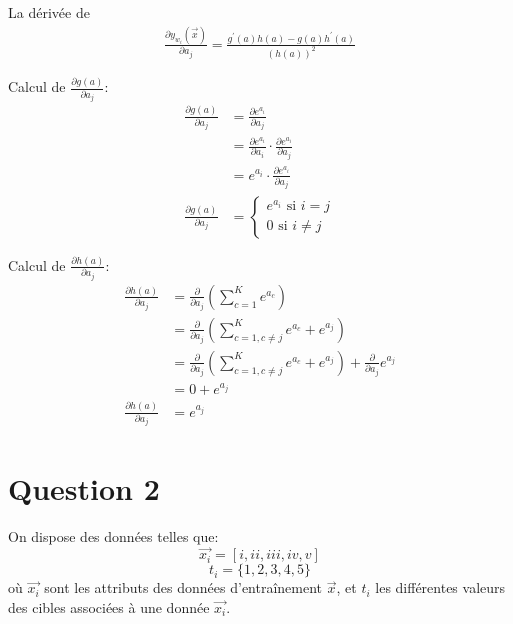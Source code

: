 La dérivée de 
\begin{equation}
\begin{split}
	\frac{\partial y_{w_i}(\overrightarrow{x})} {\partial a_j} = \frac{g^{'}(a) h(a) - g(a) h^{'}(a)} {(h(a))^2}
\end{split}
\end{equation}

Calcul de $ \frac{\partial g(a)} {\partial a_j} $:
\begin{equation}
\begin{split}
	 \frac{\partial g(a)} {\partial a_j} &= \frac{\partial e^{a_i}} {\partial a_j} \\
	 &= \frac{\partial e^{a_i}} {\partial a_i} \cdot \frac{\partial e^{a_i}} {\partial a_j} \\
	 &= e^{a_i} \cdot \frac{\partial e^{a_i}} {\partial a_j} \\
	 \frac{\partial g(a)} {\partial a_j} &= 
	 \begin{cases}
		 e^{a_i} \text{ si } i=j \\
		 0 \text{ si } i \neq j
	 \end{cases} 
\end{split}
\end{equation}

Calcul de $ \frac{\partial h(a)} {\partial a_j} $:
\begin{equation}
\begin{split}
	\frac{\partial h(a)} {\partial a_j} &= \frac{\partial}{\partial a_j} (\sum_{c=1}^K e^{a_c}) \\
	&= \frac{\partial}{\partial a_j}  \left( \sum_{c=1, c \neq j}^K e^{a_c} + e^{a_j} \right) \\
	&= \frac{\partial}{\partial a_j} \left( \sum_{c=1, c \neq j}^K e^{a_c} + e^{a_j} \right) +  \frac{\partial}{\partial a_j} e^{a_j} \\
	&= 0 + e^{a_j} \\
	\frac{\partial h(a)} {\partial a_j} &=  e^{a_j}
\end{split}
\end{equation}

\section{Question 2}
On dispose des données telles que:
$$ \overrightarrow{x_i} = [i, ii, iii, iv, v] $$
$$ t_i = \{1, 2, 3, 4, 5\} $$ 
où $\overrightarrow{x_i}$ sont les attributs des données d'entraînement $\overrightarrow{x}$, et $t_i$ les différentes valeurs des cibles associées à une donnée $\overrightarrow{x_i}$.

